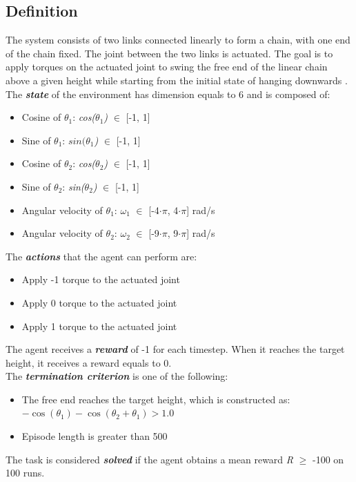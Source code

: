 \subsection{Definition}
\label{subsec:421}
The system consists of two links connected linearly to form a chain, with one end of the chain fixed. The joint between the two links is actuated. The goal is to apply torques on the actuated joint to swing the free end of the linear chain above a given height while starting from the initial state of hanging downwards \cite{gym} \cite{acrobot} \cite{sutton}.\\[0.3in]
The \textit{\textbf{state}} of the environment has dimension equals to 6 and is composed of:
\begin{itemize}
    \item Cosine of \(\theta_1\): \textit{cos(\(\theta_1\))} \(\in\) [-1, 1]
    \item Sine of \(\theta_1\): \textit{\(sin(\theta_1\))} \(\in\) [-1, 1]
    \item Cosine of \(\theta_2\): \textit{cos(\(\theta_2\))} \(\in\) [-1, 1]
    \item Sine of \(\theta_2\): \textit{sin(\(\theta_2\))} \(\in\) [-1, 1]
    \item Angular velocity of \(\theta_1\): \textit{\(\omega_1\)} \(\in\) [-4\(\cdot\pi\), 4\(\cdot\pi\)] rad/s
    \item Angular velocity of \(\theta_2\): \textit{\(\omega_2\)} \(\in\) [-9\(\cdot\pi\), 9\(\cdot\pi\)] rad/s
\end{itemize}
The \textit{\textbf{actions}} that the agent can perform are:
\begin{itemize}
    \item Apply -1 torque to the actuated joint
    \item Apply 0 torque to the actuated joint
    \item Apply 1 torque to the actuated joint
\end{itemize}
The agent receives a \textit{\textbf{reward}} of -1 for each timestep. When it reaches the target height, it receives a reward equals to 0.\\[0.1in]
The \textit{\textbf{termination criterion}} is one of the following:
\begin{itemize}
    \item The free end reaches the target height, which is constructed as: \(-\cos(\theta_1) - \cos(\theta_2 + \theta_1) > 1.0\)
    \item Episode length is greater than 500
\end{itemize}
The task is considered \textit{\textbf{solved}} if the agent obtains a mean reward \textit{R} \(\geq\) -100 on 100 runs.


